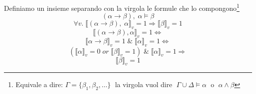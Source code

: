 \documentclass{article}
\theoremstyle{break}
\theoremstyle{break}
\theoremstyle{break}
\theoremstyle{break}
\begin{document}
\begin{exercise}
  Definiamo un insieme separando con la virgola le formule che lo compongono\footnote{
    Equivale a dire: \( \Gamma=\{ \beta_1, \beta_2, \ldots \}\; \) la virgola vuol dire
    \(\; \Gamma \cup \Delta \models \alpha\; \) o \(\; \alpha \wedge \beta \)
  }
  \[
    (\alpha \to \beta),\; \alpha \models \beta
  \]
  \[
    \forall v.\; \llbracket (\alpha \to \beta),\; \alpha\rrbracket_v=1 \Rightarrow \llbracket \beta\rrbracket_v=1
  \]
  \[
  \llbracket (\alpha \to \beta), \alpha\rrbracket_v=1 \Leftrightarrow\]
  \[\llbracket \alpha \to \beta\rrbracket_v=1\; \&\; \llbracket \alpha\rrbracket_v=1 \Leftrightarrow
  \]
  \[
    (\llbracket \alpha\rrbracket_v=0\; or\; \llbracket \beta\rrbracket_v=1)\; \&\; \llbracket \alpha\rrbracket_v=1 \Rightarrow
  \]
  \[
    \llbracket \beta\rrbracket_v=1
  \]
\end{exercise}
\end{document}
